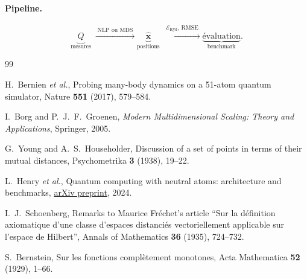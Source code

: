 \documentclass[11pt,a4paper]{article}
\theoremstyle{definition}
\theoremstyle{remark}
\newcommand{\Eryd}{\mathcal{E}_{\mathrm{Ryd}}}
\begin{document}
\paragraph{Pipeline.}
\[
  \underbrace{Q}_{\text{mesures}}
  \;\xrightarrow{\;\text{NLP ou MDS}\;}
  \underbrace{\hat{\mathbf{x}}}_{\text{positions}}
  \;\xrightarrow{\;\Eryd,\,\mathrm{RMSE}\;}
  \underbrace{\text{évaluation}}_{\text{benchmark}}.
\]

%
%
%
%
%


\begin{thebibliography}{99}

H.~Bernien \emph{et al.},
Probing many-body dynamics on a 51-atom quantum simulator,
Nature \textbf{551} (2017), 579--584.

I.~Borg and P.~J.~F.~Groenen,
\emph{Modern Multidimensional Scaling: Theory and Applications},
Springer, 2005.

G.~Young and A.~S.~Householder,
Discussion of a set of points in terms of their mutual distances,
Psychometrika \textbf{3} (1938), 19--22.

L.~Henry \emph{et al.},
Quantum computing with neutral atoms: architecture and benchmarks,
\href{https://arxiv.org/abs/2401.00000}{arXiv preprint}, 2024.

I.~J.~Schoenberg,
Remarks to Maurice Fréchet's article ``Sur la définition axiomatique
d'une classe d'espaces distanciés vectoriellement applicable sur l'espace
de Hilbert'',
Annals of Mathematics \textbf{36} (1935), 724--732.

S.~Bernstein,
Sur les fonctions complètement monotones,
Acta Mathematica \textbf{52} (1929), 1--66.

\end{thebibliography}
\end{document}
